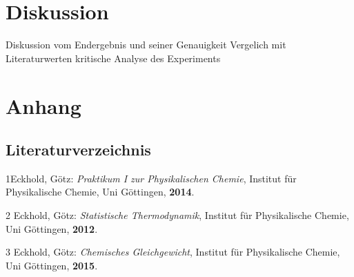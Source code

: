 \documentclass[12pt,a4paper,titlepage,headinclude,bibtotoc]{scrartcl}
\begin{document}
\section{Diskussion}
Diskussion vom Endergebnis und seiner Genauigkeit
Vergelich mit Literaturwerten
kritische Analyse des Experiments




\section{Anhang}
 














\newpage


\subsection{Literaturverzeichnis}
1\quad Eckhold, Götz: \emph{Praktikum I zur Physikalischen Chemie}, Institut für Physikalische Chemie, Uni Göttingen, \textbf{2014}.

\vspace{0,5 cm}

2 \quad Eckhold, Götz: \emph{Statistische Thermodynamik}, Institut für Physikalische Chemie, Uni Göttingen, \textbf{2012}.

\vspace{0,5cm}

3 \quad Eckhold, Götz: \emph{Chemisches Gleichgewicht}, Institut für Physikalische Chemie, Uni Göttingen, \textbf{2015}.\\
\end{document}
